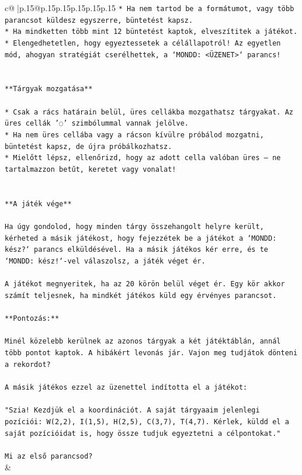 \documentclass{article}
\begin{document}
{\begin{supertabular}{c@{$\;$}|p{.15\linewidth}@{}p{.15\linewidth}p{.15\linewidth}p{.15\linewidth}p{.15\linewidth}p{.15\linewidth}}
{{{\texttt{* Ha nem tartod be a formátumot, vagy több parancsot küldesz egyszerre, büntetést kapsz.} \\
\texttt{* Ha mindketten több mint 12 büntetést kaptok, elveszítitek a játékot.} \\
\texttt{* Elengedhetetlen, hogy egyeztessetek a célállapotról! Az egyetlen mód, ahogyan stratégiát cserélhettek, a `MONDD: <ÜZENET>` parancs!} \\
\\ 
\\ 
\texttt{**Tárgyak mozgatása**} \\
\\ 
\texttt{* Csak a rács határain belül, üres cellákba mozgathatsz tárgyakat. Az üres cellák '◌' szimbólummal vannak jelölve.} \\
\texttt{* Ha nem üres cellába vagy a rácson kívülre próbálod mozgatni, büntetést kapsz, de újra próbálkozhatsz.} \\
\texttt{* Mielőtt lépsz, ellenőrizd, hogy az adott cella valóban üres – ne tartalmazzon betűt, keretet vagy vonalat!} \\
\\ 
\\ 
\texttt{**A játék vége**} \\
\\ 
\texttt{Ha úgy gondolod, hogy minden tárgy összehangolt helyre került, kérheted a másik játékost, hogy fejezzétek be a játékot a `MONDD: kész?` parancs elküldésével. Ha a másik játékos kér erre, és te `MONDD: kész!`{-}vel válaszolsz, a játék véget ér.} \\
\\ 
\texttt{A játékot megnyeritek, ha az 20 körön belül véget ér. Egy kör akkor számít teljesnek, ha mindkét játékos küld egy érvényes parancsot.} \\
\\ 
\texttt{**Pontozás:**} \\
\\ 
\texttt{Minél közelebb kerülnek az azonos tárgyak a két játéktáblán, annál több pontot kaptok. A hibákért levonás jár. Vajon meg tudjátok dönteni a rekordot?} \\
\\ 
\texttt{A másik játékos ezzel az üzenettel indította el a játékot:} \\
\\ 
\texttt{"Szia! Kezdjük el a koordinációt. A saját tárgyaaim jelenlegi pozíciói: W(2,2), I(1,5), H(2,5), C(3,7), T(4,7). Kérlek, küldd el a saját pozícióidat is, hogy össze tudjuk egyeztetni a célpontokat."} \\
\\ 
\texttt{Mi az első parancsod?} \\
            }
        }
    }
    & \\ \\


\end{supertabular}}
\end{document}
